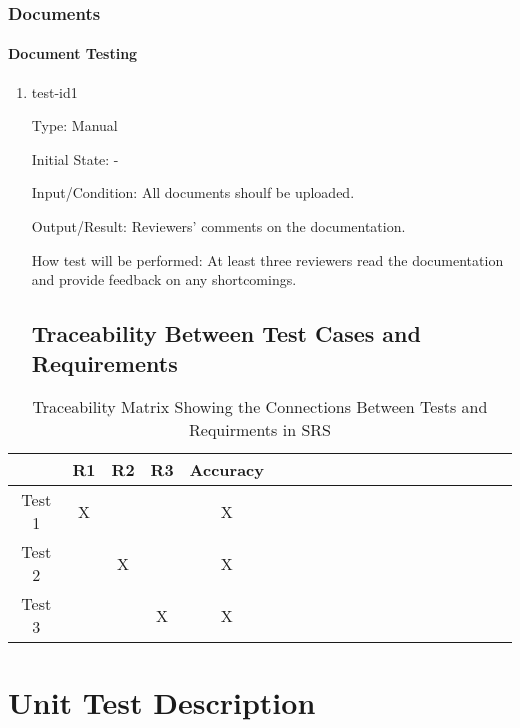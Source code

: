 \documentclass[12pt, titlepage]{article}
\begin{document}
\subsubsection{Documents}
		
\paragraph{Document Testing}

\begin{enumerate}

\item{test-id1\\}

Type: Manual
					
Initial State: -
					
Input/Condition: All documents shoulf be uploaded.
					
Output/Result: Reviewers' comments on the documentation.
					
How test will be performed:  At least three reviewers read the documentation and provide feedback on any shortcomings.

\subsection{Traceability Between Test Cases and Requirements}
\end{enumerate}
\begin{table}[h!]
\centering
\begin{tabular}{|c|c|c|c|c|c|c|c|c|c|c|c|c|c|c|c|c|c|c|c|}
\hline
	&R1 &R2 & R3 & Accuracy\\
\hline
Test 1     & X& & & X \\ \hline
Test 2    & & X & & X\\ \hline
Test 3     & & & X & X\\ \hline
\end{tabular}
\caption{Traceability Matrix Showing the Connections Between Tests and Requirments in SRS}
\label{Table:A_trace}
\end{table}

\section{Unit Test Description}


\end{document}
